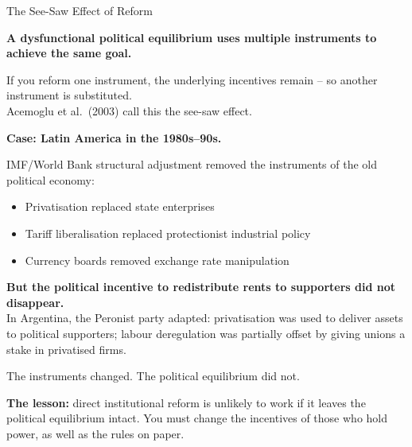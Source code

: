 \documentclass[10pt]{beamer}
\begin{document}
\begin{frame}[allowframebreaks]{The See-Saw Effect of Reform}

\textbf{A dysfunctional political equilibrium uses multiple instruments to achieve the same goal.}


If you reform one instrument, the underlying incentives remain -- so another instrument is substituted.\\[4pt]
Acemoglu et al.\ (2003) call this \alert{the see-saw effect}.


\textbf{Case: Latin America in the 1980s--90s.}

IMF/World Bank structural adjustment removed the instruments of the old political economy:
\begin{itemize}
\item Privatisation replaced state enterprises
\item Tariff liberalisation replaced protectionist industrial policy
\item Currency boards removed exchange rate manipulation
\end{itemize}


\textbf{But the political incentive to redistribute rents to supporters did not disappear.}\\
In Argentina, the Peronist party adapted: privatisation was used to deliver assets to political supporters; labour deregulation was partially offset by giving unions a stake in privatised firms.


\alert{The instruments changed. The political equilibrium did not.}


\textbf{The lesson:} direct institutional reform is unlikely to work if it leaves the political equilibrium intact. You must change the incentives of those who hold power, as well as the rules on paper.
\end{frame}
\end{document}
